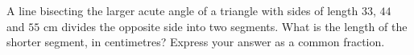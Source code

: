 A line bisecting the larger acute angle of a triangle with sides of length $33$, $44$ and $55$ cm divides the opposite side into two segments. What is the length of the shorter segment, in centimetres? Express your answer as a common fraction.
